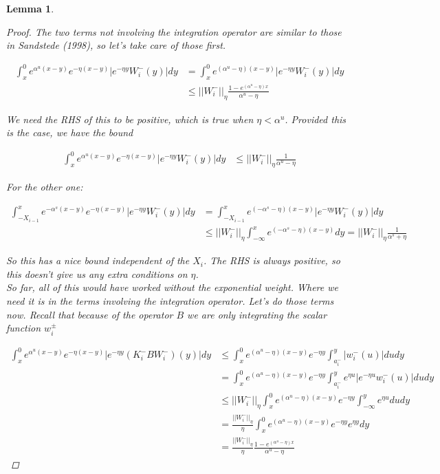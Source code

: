 \documentclass[12pt]{article}
\newtheorem{lemma}{Lemma}
\begin{document}
\begin{lemma}
\begin{proof}
The two terms not involving the integration operator are similar to those in Sandstede (1998), so let's take care of those first.

\begin{align*}
\int_x^0 e^{\alpha^u (x-y)}e^{-\eta(x-y)}|e^{-\eta y} W_i^-(y)| dy &= \int_x^0 e^{(\alpha^u - \eta) (x-y)}|e^{-\eta y} W_i^-(y)| dy \\
&\leq ||W_i^-||_\eta \frac{1 - e^{(\alpha^u - \eta)x}}{\alpha^u - \eta}
\end{align*}

We need the RHS of this to be positive, which is true when $\eta < \alpha^u$. Provided this is the case, we have the bound

\begin{align*}
\int_x^0 e^{\alpha^u (x-y)}e^{-\eta(x-y)}|e^{-\eta y} W_i^-(y)| dy &\leq ||W_i^-||_\eta \frac{1}{\alpha^u - \eta}
\end{align*}

For the other one:

\begin{align*}
\int_{-X_{i-1}}^x e^{-\alpha^s (x-y)}e^{-\eta(x-y)}|e^{-\eta y} W_i^-(y)| dy &= \int_{-X_{i-1}}^x e^{(-\alpha^s - \eta) (x-y)}|e^{-\eta y} W_i^-(y)| dy \\
&\leq ||W_i^-||_\eta \int_{-\infty}^x e^{(-\alpha^s - \eta) (x-y)} dy = ||W_i^-||_\eta \frac{1}{\alpha^s + \eta}
\end{align*}

So this has a nice bound independent of the $X_i$. The RHS is always positive, so this doesn't give us any extra conditions on $\eta$. \\

So far, all of this would have worked without the exponential weight. Where we need it is in the terms involving the integration operator. Let's do those terms now. Recall that because of the operator $B$ we are only integrating the scalar function $w_i^\pm$

\begin{align*}
\int_x^0 e^{\alpha^u (x-y)}e^{-\eta(x-y)}|e^{-\eta y} (K_i^- B W_i^-)(y)| dy &\leq \int_x^0 e^{(\alpha^u - \eta)(x-y)}e^{-\eta y} \int_{a_i^-}^y |w_i^-(u)| du dy \\
&= \int_x^0 e^{(\alpha^u - \eta)(x-y)}e^{-\eta y} \int_{a_i^-}^y e^{\eta u} |e^{-\eta u} w_i^-(u)| du dy \\
&\leq ||W_i^-||_\eta \int_x^0 e^{(\alpha^u - \eta)(x-y)}e^{-\eta y} \int_{-\infty}^y e^{\eta u} du dy \\
&= \frac{||W_i^-||_\eta}{\eta} \int_x^0 e^{(\alpha^u - \eta)(x-y)}e^{-\eta y} e^{\eta y} dy \\
&= \frac{||W_i^-||_\eta}{\eta} \frac{1 - e^{(\alpha^u - \eta)x}}{\alpha^u - \eta} 
\end{align*}


\end{proof}
\end{lemma}
\end{document}
